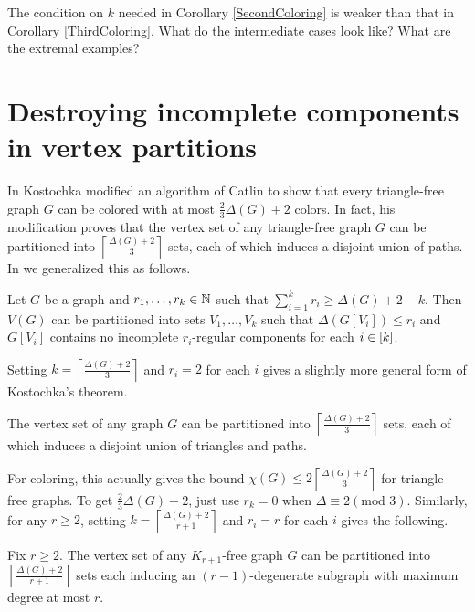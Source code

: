 \begin{question}
The condition on $k$ needed in Corollary \ref{SecondColoring} is weaker than that in Corollary \ref{ThirdColoring}.  What do the intermediate cases look like?  What are the extremal examples?
\end{question}

\section{Destroying incomplete components in vertex partitions}\label{ShuffleHeightSection}
In \cite{KostochkaTriangleFree} Kostochka modified an algorithm of Catlin \cite{CatlinAnotherBound} to show that every triangle-free graph $G$ can be colored with at most $\frac23 \Delta(G) + 2$ colors.  
In fact, his modification proves that the vertex set of any triangle-free graph $G$ can be partitioned into $\left \lceil \frac{\Delta(G) + 2}{3} \right \rceil$ sets, 
each of which induces a disjoint union of paths. In \cite{rabern2010destroying} we generalized this as follows.

\begin{lem}\label{DestroyLemma}
Let $G$ be a graph and $r_1, \ldots, r_k \in \mathbb{N}$ such that $\sum_{i=1}^k r_i \geq \Delta(G) + 2 - k$. Then $V(G)$ can be partitioned into sets $V_1, \ldots, V_k$ such that $\Delta(G[V_i]) \leq r_i$ and $G[V_i]$ contains no incomplete $r_i$-regular components for each $i \in \left[k\right]$.
\end{lem}

Setting $k = \left \lceil \frac{\Delta(G) + 2}{3} \right \rceil$ and $r_i = 2$ for each $i$ gives a slightly more general form of Kostochka's theorem.

\begin{cor}\label{TrianglesAndPaths}
The vertex set of any graph $G$ can be partitioned into $\left \lceil \frac{\Delta(G) + 2}{3} \right \rceil$ sets, each of which induces a disjoint union of triangles and paths.
\end{cor}

For coloring, this actually gives the bound $\chi(G) \leq 2  \left \lceil \frac{\Delta(G) + 2}{3} \right \rceil$ for triangle free graphs.  
To get $\frac23 \Delta(G) + 2$, just use $r_k = 0$ when $\Delta \equiv 2 (\text{mod } 3)$. 
Similarly, for any $r \geq 2$, setting $k = \left \lceil \frac{\Delta(G) + 2}{r + 1} \right \rceil$ and $r_i = r$ for each $i$ gives the following.
\begin{cor}\label{NoKrPlusOne}
Fix $r \geq 2$.  The vertex set of any $K_{r + 1}$-free graph $G$ can be partitioned into $\left \lceil \frac{\Delta(G) + 2}{r + 1} \right \rceil$ sets each inducing an $(r-1)$-degenerate subgraph with maximum degree at most $r$.
\end{cor}

